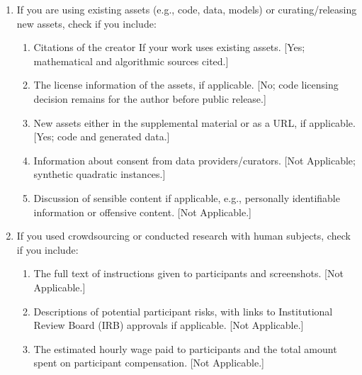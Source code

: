 \documentclass[letterpaper,twoside]{article}
\begin{document}
\begin{enumerate}
\begin{enumerate}
\item All the training details (e.g., data splits, hyperparameters, how they were chosen). [Yes; no training; fixed experimental parameters in Section~\ref{sec:experiments} and supplementary README.]
\item A clear definition of the specific measure or statistics and error bars (e.g., with respect to the random seed after running experiments multiple times). [Yes; Figure~\ref{fig:budget} and supplementary protocol.]
\item A description of the computing infrastructure used. (e.g., type of GPUs, internal cluster, or cloud provider). [Yes; local CPU, Python and library versions in supplementary environment file.]
\end{enumerate}
\item If you are using existing assets (e.g., code, data, models) or curating/releasing new assets, check if you include:
\begin{enumerate}
\item Citations of the creator If your work uses existing assets. [Yes; mathematical and algorithmic sources cited.]
\item The license information of the assets, if applicable. [No; code licensing decision remains for the author before public release.]
\item New assets either in the supplemental material or as a URL, if applicable. [Yes; code and generated data.]
\item Information about consent from data providers/curators. [Not Applicable; synthetic quadratic instances.]
\item Discussion of sensible content if applicable, e.g., personally identifiable information or offensive content. [Not Applicable.]
\end{enumerate}
\item If you used crowdsourcing or conducted research with human subjects, check if you include:
\begin{enumerate}
\item The full text of instructions given to participants and screenshots. [Not Applicable.]
\item Descriptions of potential participant risks, with links to Institutional Review Board (IRB) approvals if applicable. [Not Applicable.]
\item The estimated hourly wage paid to participants and the total amount spent on participant compensation. [Not Applicable.]
\end{enumerate}
\end{enumerate}
\end{document}

